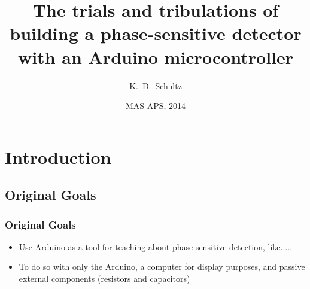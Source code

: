 \documentclass{beamer}
\title[PSD with Arduino CC-BY-SA.4.0] %
{The trials and tribulations of building a phase-sensitive detector with an Arduino microcontroller}
\author[K.\ D.\ Schultz] %
{K.~D.~Schultz}
\institute[Hartwick College] %
{
 
  Department of Physics\\
  Hartwick College
}
\date[MAS-APS] %
{MAS-APS, 2014}
\begin{document}
\begin{frame}
  \titlepage
\end{frame}






\section {Introduction}

\subsection{Original Goals}

\begin{frame}
\frametitle{Original Goals}

\begin{itemize}%
\item {Use Arduino as a tool for teaching about phase-sensitive detection, like.....}
\item{To do so with only the Arduino, a computer for display purposes, and passive external components (resistors and capacitors)}

\end{itemize}
\end{frame}
\end{document}
